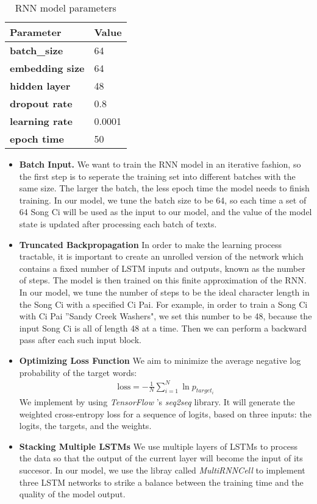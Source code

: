 \begin{table}[htpb]
\centering
\caption{RNN model parameters}
\label{table:rnn}
\begin{tabular}{|l|l|}
\hline
\textbf{Parameter}      & \textbf{Value} \\ \hline
\textbf{batch\_size}    & 64             \\ \hline
\textbf{embedding size} & 64             \\ \hline
\textbf{hidden layer}   & 48             \\ \hline
\textbf{dropout rate}   & 0.8            \\ \hline
\textbf{learning rate}  & 0.0001         \\ \hline
\textbf{epoch time}     & 50             \\ \hline
\end{tabular}
\end{table}

\begin{itemize}
\item \textbf{Batch Input.} We want to train the RNN model in an iterative fashion, so the first step is to seperate the training set into different batches with the same size. The larger the batch, the less epoch time the model needs to finish training. In our model, we tune the batch size to be 64, so each time a set of 64 Song Ci will be used as the input to our model, and the value of the model state is updated after processing each batch of texts.

\item \textbf{Truncated Backpropagation} In order to make the learning process tractable, it is important to create an unrolled version of the network which contains a fixed number of LSTM inputs and outputs, known as the number of steps. The model is then trained on this finite approximation of the RNN. 
%
In our model, we tune the number of steps to be the ideal character length in the Song Ci with a specified Ci Pai. For example, in order to train a Song Ci with Ci Pai ''Sandy Creek Washers", we set this number to be 48, because the input Song Ci is all of length 48 at a time.
%
Then we can perform a backward pass after each such input block.

\item \textbf{Optimizing Loss Function} We aim to minimize the average negative log probability of the target words: 
\begin{align*}
\text{loss} = -\frac{1}{N} \sum_{i=1}^{N} \ln p_{target_i}
\end{align*}
We implement by using \emph{TensorFlow} 's \emph{seq2seq} library. It will generate the weighted cross-entropy loss for a sequence of logits, based on three inputs: the logits, the targets, and the weights. 

 
\item \textbf{Stacking Multiple LSTMs} We  use multiple layers of LSTMs to process the data so that the output of the current layer will become the input of its succesor.
%
In our model,  we use the libray called \emph{MultiRNNCell} to implement three LSTM networks to strike a balance between the training time and the quality of the model output.
\end{itemize}


